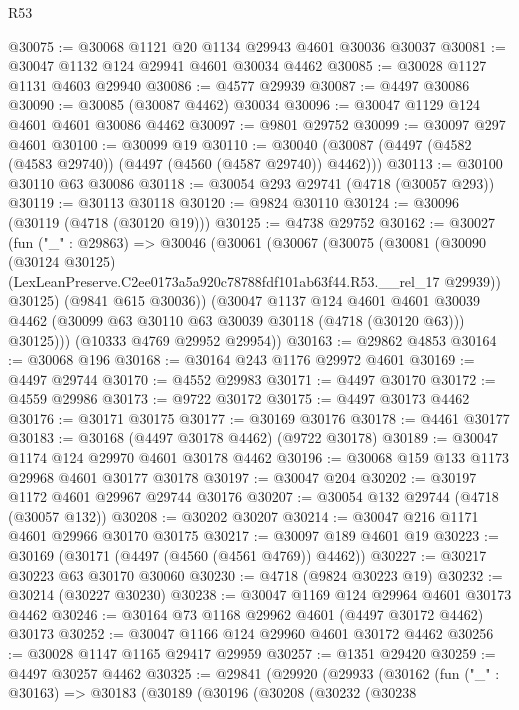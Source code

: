 \begin{lexlean}{R53}
\begin{coremodule}
@30075 := @30068 @1121 @20 @1134 @29943 @4601 @30036 @30037
@30081 := @30047 @1132 @124 @29941 @4601 @30034 @4462
@30085 := @30028 @1127 @1131 @4603 @29940
@30086 := @4577 @29939
@30087 := @4497 @30086
@30090 := @30085 (@30087 @4462) @30034
@30096 := @30047 @1129 @124 @4601 @4601 @30086 @4462
@30097 := @9801 @29752
@30099 := @30097 @297 @4601
@30100 := @30099 @19
@30110 := @30040 (@30087 (@4497 (@4582 (@4583 @29740)) (@4497 (@4560 (@4587 @29740)) @4462)))
@30113 := @30100 @30110 @63 @30086
@30118 := @30054 @293 @29741 (@4718 (@30057 @293))
@30119 := @30113 @30118
@30120 := @9824 @30110
@30124 := @30096 (@30119 (@4718 (@30120 @19)))
@30125 := @4738 @29752
@30162 := @30027
    (fun ("_" : @29863) =>
    @30046
      (@30061
        (@30067
          (@30075
            (@30081
              (@30090
                (@30124 @30125)
                (LexLeanPreserve.C2ee0173a5a920c78788fdf101ab63f44.R53.__rel_17 @29939))
              @30125)
            (@9841 @615 @30036))
          (@30047
            @1137
            @124
            @4601
            @4601
            @30039
            @4462
            (@30099 @63 @30110 @63 @30039 @30118 (@4718 (@30120 @63)))
            @30125)))
      (@10333 @4769 @29952 @29954))
@30163 := @29862 @4853
@30164 := @30068 @196
@30168 := @30164 @243 @1176 @29972 @4601
@30169 := @4497 @29744
@30170 := @4552 @29983
@30171 := @4497 @30170
@30172 := @4559 @29986
@30173 := @9722 @30172
@30175 := @4497 @30173 @4462
@30176 := @30171 @30175
@30177 := @30169 @30176
@30178 := @4461 @30177
@30183 := @30168 (@4497 @30178 @4462) (@9722 @30178)
@30189 := @30047 @1174 @124 @29970 @4601 @30178 @4462
@30196 := @30068 @159 @133 @1173 @29968 @4601 @30177 @30178
@30197 := @30047 @204
@30202 := @30197 @1172 @4601 @29967 @29744 @30176
@30207 := @30054 @132 @29744 (@4718 (@30057 @132))
@30208 := @30202 @30207
@30214 := @30047 @216 @1171 @4601 @29966 @30170 @30175
@30217 := @30097 @189 @4601 @19
@30223 := @30169 (@30171 (@4497 (@4560 (@4561 @4769)) @4462))
@30227 := @30217 @30223 @63 @30170 @30060
@30230 := @4718 (@9824 @30223 @19)
@30232 := @30214 (@30227 @30230)
@30238 := @30047 @1169 @124 @29964 @4601 @30173 @4462
@30246 := @30164 @73 @1168 @29962 @4601 (@4497 @30172 @4462) @30173
@30252 := @30047 @1166 @124 @29960 @4601 @30172 @4462
@30256 := @30028 @1147 @1165 @29417 @29959
@30257 := @1351 @29420
@30259 := @4497 @30257 @4462
@30325 := @29841
    (@29920
      (@29933
        (@30162
          (fun ("_" : @30163) =>
          @30183
            (@30189
              (@30196
                (@30208
                  (@30232
                    (@30238

\end{coremodule}
\end{lexlean}
